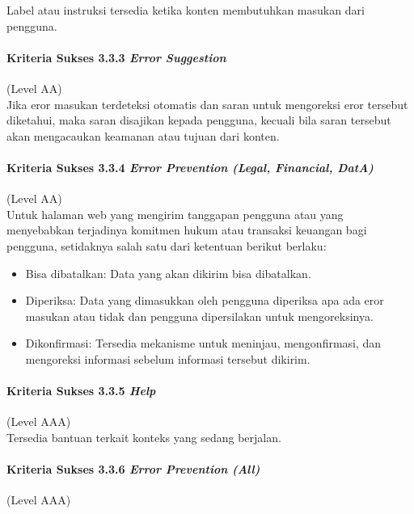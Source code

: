 Label atau instruksi tersedia ketika konten membutuhkan masukan dari pengguna.

\paragraph{Kriteria Sukses 3.3.3 \textit{Error Suggestion}}
\label{sec:kriteria_sukses_3.3.3}
(Level AA)\\

Jika eror masukan terdeteksi otomatis dan saran untuk mengoreksi eror tersebut diketahui, maka saran disajikan kepada pengguna, kecuali bila saran tersebut akan mengacaukan keamanan atau tujuan dari konten.

\paragraph{Kriteria Sukses 3.3.4 \textit{Error Prevention (Legal, Financial, DatA)\\}}
\label{sec:kriteria_sukses_3.3.4}
(Level AA)\\

Untuk halaman web yang mengirim tanggapan pengguna atau yang menyebabkan terjadinya komitmen hukum atau transaksi keuangan bagi pengguna, setidaknya salah satu dari ketentuan berikut berlaku:
\begin{itemize}
	\item Bisa dibatalkan: Data yang akan dikirim bisa dibatalkan.
	\item Diperiksa: Data yang dimasukkan oleh pengguna diperiksa apa ada eror masukan atau tidak dan pengguna dipersilakan untuk mengoreksinya.
	\item Dikonfirmasi: Tersedia mekanisme untuk meninjau, mengonfirmasi, dan mengoreksi informasi sebelum informasi tersebut dikirim.
\end{itemize}

\paragraph{Kriteria Sukses 3.3.5 \textit{Help}}
\label{sec:kriteria_sukses_3.3.5}
(Level AAA)\\

Tersedia bantuan terkait konteks yang sedang berjalan.

\paragraph{Kriteria Sukses 3.3.6 \textit{Error Prevention (All)}}
\label{sec:kriteria_sukses_3.3.6}
(Level AAA)\\

